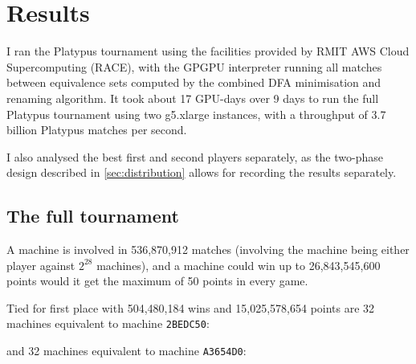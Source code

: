\chapter{Results}
\label{chap:results}

I ran the Platypus tournament using the facilities provided by
RMIT AWS Cloud Supercomputing (RACE), with the GPGPU
interpreter running all matches between equivalence sets
computed by the combined DFA minimisation and renaming
algorithm. It took about 17 GPU-days over 9 days to run the full
Platypus tournament using two g5.xlarge instances, with a
throughput of 3.7 billion Platypus matches per second.

I also analysed the best first and second players separately,
as the two-phase design described in \autoref{sec:distribution}
allows for recording the results separately.

\section{The full tournament}

A machine is involved in 536,870,912 matches (involving the
machine being either player against $2^{28}$ machines), and a
machine could win up to 26,843,545,600 points would it get the
maximum of 50 points in every game.

Tied for first place with 504,480,184 wins and 15,025,578,654 points are 32 machines equivalent to machine \texttt{2BEDC50}:


\noindent and 32 machines equivalent to machine \texttt{A3654D0}:

